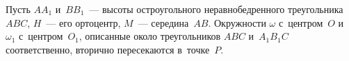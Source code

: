 




Пусть $AA_{1}$ и~$BB_{1}$~--- высоты остроугольного неравнобедренного
треугольника $ABC$, $H$~--- его ортоцентр, $M$~--- середина~$AB$.
Окружности $\omega$ с~центром~$O$ и~$\omega_{1}$ с~центром~$O_{1}$, описанные
около треугольников $ABC$ и~$A_{1}B_{1} C$ соответственно, вторично
пересекаются в~точке~$P$.

